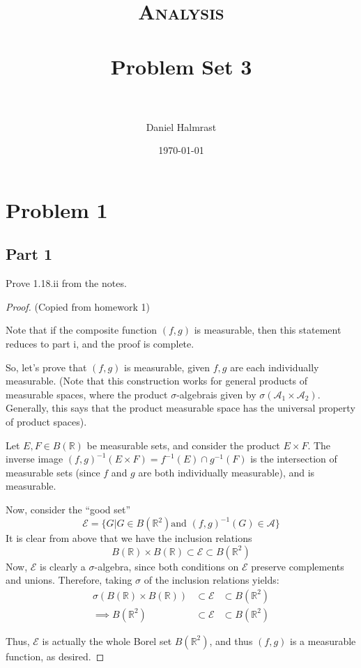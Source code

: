 \documentclass[fontsize=11pt]{scrartcl} %
\title{	
\normalfont \normalsize 
\textsc{Analysis} \\ [25pt] %
\horrule{0.5pt} \\[0.4cm] %
\huge Problem Set 3\\ %
\horrule{2pt} \\[0.5cm] %
}
\author{Daniel Halmrast} %
\date{\normalsize\today} %
\numberwithin{equation}{section} %
\numberwithin{figure}{section} %
\numberwithin{table}{section} %
\newcommand{\sigalg}{$\sigma$-algebra}
\begin{document}
\maketitle %

\section*{Problem 1}
\subsection*{Part 1}
Prove 1.18.ii from the notes.
\\
\begin{proof}
(Copied from homework 1)

Note that if the composite function $(f,g)$ is measurable, then this statement reduces to
part i, and the proof is complete.

So, let's prove that $(f,g)$ is measurable, given $f,g$ are each individually measurable.
(Note that this construction works for general products of measurable spaces, where the
product \sigalg is given by $\sigma(\mathscr{A}_1\times\mathscr{A}_2)$. Generally, this
says that the product measurable space has the universal property of product spaces).

Let $E,F\in B(\mathbb{R})$ be measurable sets, and consider the product $E\times F$. The
inverse image $(f,g)^{-1}(E\times F) = f^{-1}(E)\cap g^{-1}(F)$ is the intersection of
measurable sets (since $f$ and $g$ are both individually measurable), and is measurable.

Now, consider the ``good set''
\[
\mathscr{E} = \{G | G\in B(\mathbb{R}^2) \textrm{and } (f,g)^{-1}(G) \in \mathscr{A}\}
\]
It is clear from above that we have the inclusion relations
\[
B(\mathbb{R})\times B(\mathbb{R}) \subset \mathscr{E} \subset B(\mathbb{R}^2)
\]
Now, $\mathscr{E}$ is clearly a \sigalg, since both conditions on $\mathscr{E}$ preserve
complements and unions. Therefore, taking $\sigma$ of the inclusion relations yields:
\[
\begin{aligned}
\sigma(B(\mathbb{R})\times B(\mathbb{R})) &\subset \mathscr{E} &\subset B(\mathbb{R}^2)\\
\implies B(\mathbb{R}^2) &\subset \mathscr{E} &\subset B(\mathbb{R}^2)
\end{aligned}
\]

Thus, $\mathscr{E}$ is actually the whole Borel set $B(\mathbb{R}^2)$, and thus
$(f,g)$ is a measurable function, as desired.
\end{proof}
\end{document}
